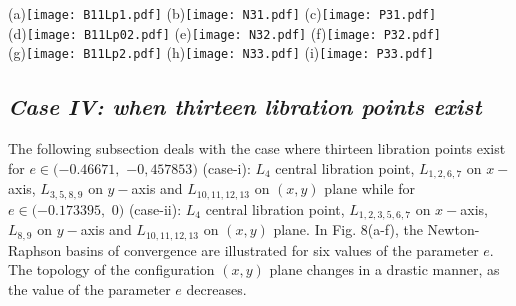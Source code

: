 \documentclass[preprint,fleqn,5p,numbers,sort&compress]{elsarticle}
\begin{document}
\begin{figure*}\label{Fig:8}
\begin{center}
(a)\texttt{[image: B11Lp1.pdf]}%
(b)\texttt{[image: N31.pdf]}
(c)\texttt{[image: P31.pdf]}\\
(d)\texttt{[image: B11Lp02.pdf]}%
(e)\texttt{[image: N32.pdf]}
(f)\texttt{[image: P32.pdf]}\\
(g)\texttt{[image: B11Lp2.pdf]}%
(h)\texttt{[image: N33.pdf]}
(i)\texttt{[image: P33.pdf]}
\caption{The Newton-Raphson basins of attraction on the $(x,y)$ plane
for the case when eleven libration points exist for:  (a) $e=-0.1947$;
(d) $e=-0.1795$; (g) $e=-0.1743$. The color code denoting the attractors
is as follows: $L_4$ (\emph{green}); $L_8$ (\emph{purple}); $L_9$ (\emph{crimson});
 $L_{10}$ (\emph{teal}); $L_{11}$ (\emph{magenta}); $L_{12}$ (\emph{orange});
 $L_{13}$ (\emph{light green}) and non-converging points (\emph{white}).
 (b, e, h: the middle panels)
  The corresponding
  distribution of the number $N$ of required iterations for obtaining the attracting
  regions, (c, f, i: the right panels) the corresponding probability distributions of required number of iterations
  for obtaining the Newton-Raphson basins of convergence, shown in panels-(a, d, g) respectively. The vertical, dashed, red line indicates, in each case,
the most probable number $N^*$ of iterations. The black dots show the position of the libration points. (Color figure online).}
\end{center}
\end{figure*}
\subsection{\emph{Case IV: when thirteen libration points exist}}
\label{sec:404}
The following subsection deals with the case where thirteen libration points exist for $e \in (-0.46671,$
$ -0,457853)$ (case-i): $L_4$ central libration point, $L_{1,2,6,7}$ on $x-$axis, $L_{3,5,8,9}$ on $y-$axis and
$L_{10,11,12,13}$ on $(x, y)$ plane while for $e \in (-0.173395,$ $0)$ (case-ii): $L_4$ central libration point,
$L_{1,2,3,5,6,7}$ on $x-$axis, $L_{8,9}$ on $y-$axis and $L_{10,11,12,13}$ on $(x, y)$ plane. In Fig.
\textcolor[rgb]{1.00,0.00,0.50}{8}(a-f), the Newton-Raphson basins of convergence are illustrated for six values of the parameter $e$. The topology of the configuration $(x,y)$ plane changes in a drastic manner, as the value of the parameter $e$ decreases.
\end{document}
